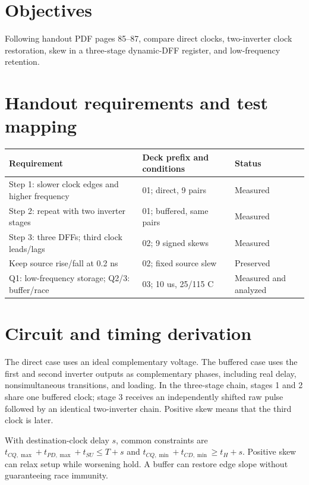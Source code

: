 \section{Objectives}

Following handout PDF pages 85--87, compare direct clocks, two-inverter clock restoration, skew in a three-stage dynamic-DFF register, and low-frequency retention.

\section{Handout requirements and test mapping}

\begin{center}
\small
\setlength{\tabcolsep}{4pt}
\begin{tabular}{p{.42\linewidth}p{.29\linewidth}p{.18\linewidth}}
\toprule
Requirement & Deck prefix and conditions & Status \\
\midrule
Step 1: slower clock edges and higher frequency & 01; direct, 9 pairs & Measured \\
Step 2: repeat with two inverter stages & 01; buffered, same pairs & Measured \\
Step 3: three DFFs; third clock leads/lags & 02; 9 signed skews & Measured \\
Keep source rise/fall at 0.2 ns & 02; fixed source slew & Preserved \\
Q1: low-frequency storage; Q2/3: buffer/race & 03; 10 us, 25/115 C & Measured and analyzed \\
\bottomrule
\end{tabular}
\end{center}

\section{Circuit and timing derivation}

The direct case uses an ideal complementary voltage. The buffered case uses the first and second inverter outputs as complementary phases, including real delay, nonsimultaneous transitions, and loading. In the three-stage chain, stages 1 and 2 share one buffered clock; stage 3 receives an independently shifted raw pulse followed by an identical two-inverter chain. Positive skew means that the third clock is later.

With destination-clock delay $s$, common constraints are $t_{CQ,\max}+t_{PD,\max}+t_{SU}\leq T+s$ and $t_{CQ,\min}+t_{CD,\min}\geq t_H+s$. Positive skew can relax setup while worsening hold. A buffer can restore edge slope without guaranteeing race immunity.

